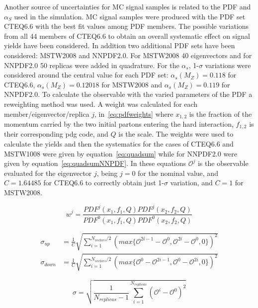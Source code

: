Another source of uncertainties for MC signal samples is related to the PDF and $\alpha_{S}$ used in the simulation. MC signal samples were produced with the PDF set CTEQ6.6 with the best fit values among PDF members. The possible variations from all 44 members of CTEQ6.6 to obtain an overall systematic effect on signal yields have been considered. In addition two additional PDF sets have been considered: MSTW2008 and NNPDF2.0. For MSTW2008 40 eigenvectors and for NNPDF2.0 50 replicas were added in quadrature. For the $\alpha_{s}$, 1-$\sigma$ variations were considered around the central value for each PDF set: $\alpha_{s}(M_{Z})=0.118$ for CTEQ6.6, $\alpha_{s}(M_{Z})=0.12018$ for MSTW2008 and $\alpha_{s}(M_{Z})=0.119$ for NNPDF2.0. To calculate the observable with the varied parameters of the PDF a reweighting method was used. A weight was calculated for each member/eigenvector/replica $j$, in~\ref{eq:pdfweights} where $x_{1,2}$ is the fraction of the momentum carried by the two initial partons entering the hard interaction, $f_{1,2}$ is their corresponding pdg code, and $Q$ is the scale. The weights were used to calculate the yields and then the systematics for the cases of CTEQ6.6 and MSTW1008 were given by equation~\ref{eq:quadsum} while for NNPDF2.0 were given by equation~\ref{eq:quadsumNNPDF}. In these equations $\mathcal{O}^{j}$ is the observable evaluated for the eigenvector $j$, being $j=0$ for the nominal value, and $C=1.64485$ for CTEQ6.6 to correctly obtain just 1-$\sigma$ variation, and $C=1$ for MSTW2008.

\begin{equation} \label{eq:pdfweights}
w^{j}=\frac{PDF^{j}(x_{1},f_{1},Q)PDF^{j}(x_{2},f_{2},Q)}{PDF^{0}(x_{1},f_{1},Q)PDF^{0}(x_{2},f_{2},Q)}
\end{equation}

\begin{align} \label{eq:quadsum}
\sigma_{up} & = \frac{1}{C}\sqrt{\sum_{i=1}^{N_{vectors}/2}(max\{\mathcal{O}^{2i-1}-\mathcal{O}^{0},\mathcal{O}^{2i}-\mathcal{O}^{0},0\})^{2}} \nonumber\\
\sigma_{down} & = \frac{1}{C}\sqrt{\sum_{i=1}^{N_{vectors}/2}(max\{\mathcal{O}^{0}-\mathcal{O}^{2i-1},\mathcal{O}^{0}-\mathcal{O}^{2i},0\})^{2}}
\end{align}

\begin{equation} \label{eq:quadsumNNPDF}
\sigma = \sqrt{\frac{1}{N_{replicas}-1}\sum_{i=1}^{N_{replicas}}(\mathcal{O}^{i}-\mathcal{O}^{0})^{2}} 
\end{equation}

